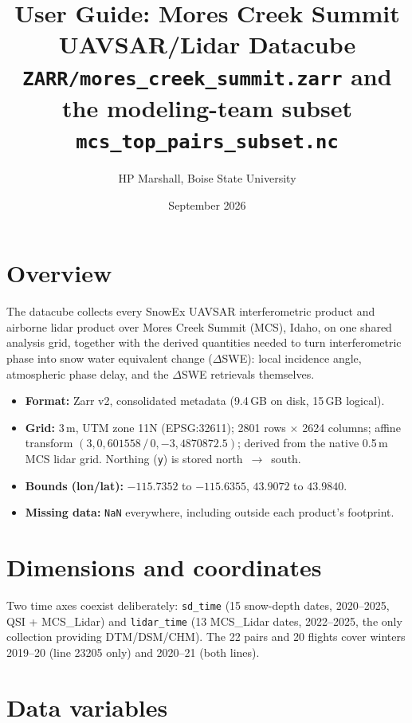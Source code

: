 \documentclass[11pt]{article}
\title{User Guide: Mores Creek Summit UAVSAR/Lidar Datacube\\
\large \texttt{ZARR/mores\_creek\_summit.zarr} and the modeling-team subset
\texttt{mcs\_top\_pairs\_subset.nc}}
\author{HP Marshall, Boise State University}
\date{September 2026}
\begin{document}
\maketitle

\section{Overview}

The datacube collects every SnowEx UAVSAR interferometric product and airborne lidar
product over Mores Creek Summit (MCS), Idaho, on one shared analysis grid, together with
the derived quantities needed to turn interferometric phase into snow water equivalent
change ($\Delta$SWE): local incidence angle, atmospheric phase delay, and the $\Delta$SWE
retrievals themselves.

\begin{itemize}
\item \textbf{Format:} Zarr v2, consolidated metadata (9.4\,GB on disk, 15\,GB logical).
\item \textbf{Grid:} 3\,m, UTM zone 11N (EPSG:32611); 2801 rows $\times$ 2624 columns;
      affine transform $(3, 0, 601558\,/\,0, -3, 4870872.5)$; derived from the native
      0.5\,m MCS lidar grid. Northing (\texttt{y}) is stored north~$\to$~south.
\item \textbf{Bounds (lon/lat):} $-115.7352$ to $-115.6355$, $43.9072$ to $43.9840$.
\item \textbf{Missing data:} \texttt{NaN} everywhere, including outside each product's
      footprint.
\end{itemize}

\section{Dimensions and coordinates}

\noindent\resizebox{\textwidth}{!}{}

Two time axes coexist deliberately: \texttt{sd\_time} (15 snow-depth dates, 2020--2025,
QSI + MCS\_Lidar) and \texttt{lidar\_time} (13 MCS\_Lidar dates, 2022--2025, the only
collection providing DTM/DSM/CHM). The 22 pairs and 20 flights cover winters 2019--20
(line 23205 only) and 2020--21 (both lines).

\section{Data variables}
\end{document}
